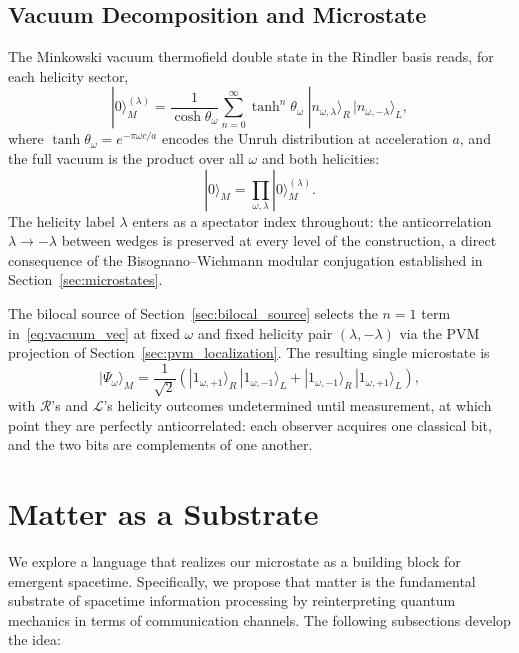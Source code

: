 \documentclass[12pt,a4paper]{article}
\begin{document}
\subsection{Vacuum Decomposition and Microstate}

The Minkowski vacuum thermofield double state in the Rindler 
basis reads, for each helicity sector,
\begin{equation}
    |0\rangle_M^{(\lambda)}
    = \frac{1}{\cosh\theta_\omega}
      \sum_{n=0}^\infty \tanh^n\theta_\omega\;
      |n_{\omega,\lambda}\rangle_R\,
      |n_{\omega,-\lambda}\rangle_L,
\label{eq:vacuum_vec}
\end{equation}
where $\tanh\theta_\omega = e^{-\pi\omega c/a}$ encodes the 
Unruh distribution at acceleration $a$, and the full vacuum 
is the product over all $\omega$ and both helicities:
\begin{equation}
    |0\rangle_M = \prod_{\omega,\lambda} 
    |0\rangle_M^{(\lambda)}.
\end{equation}
The helicity label $\lambda$ enters as a spectator index 
throughout: the anticorrelation $\lambda \to -\lambda$ between 
wedges is preserved at every level of the construction, 
a direct consequence of the Bisognano--Wichmann modular 
conjugation established in Section~\ref{sec:microstates}.

The bilocal source of Section~\ref{sec:bilocal_source} 
selects the $n=1$ term in~\eqref{eq:vacuum_vec} at fixed 
$\omega$ and fixed helicity pair $(\lambda, -\lambda)$ via 
the PVM projection of Section~\ref{sec:pvm_localization}. 
The resulting single microstate is
\begin{equation}
    |\Psi_{\omega}\rangle_M
    = \frac{1}{\sqrt{2}}\left(
        |1_{\omega,+1}\rangle_R\,|1_{\omega,-1}\rangle_L 
        + |1_{\omega,-1}\rangle_R\,|1_{\omega,+1}\rangle_L
      \right),
\label{eq:microstate_vec}
\end{equation}
with $\mathcal{R}$'s and $\mathcal{L}$'s helicity outcomes 
undetermined until measurement, at which point they are 
perfectly anticorrelated: each observer acquires one 
classical bit, and the two bits are complements of one another.


\section{Matter as a Substrate}
\label{sec:substrate}

We explore a language that realizes our microstate as a building block for emergent spacetime. Specifically, we propose that matter is the fundamental substrate of spacetime information processing by reinterpreting quantum mechanics in terms of communication channels. The following subsections develop the idea:
\end{document}
